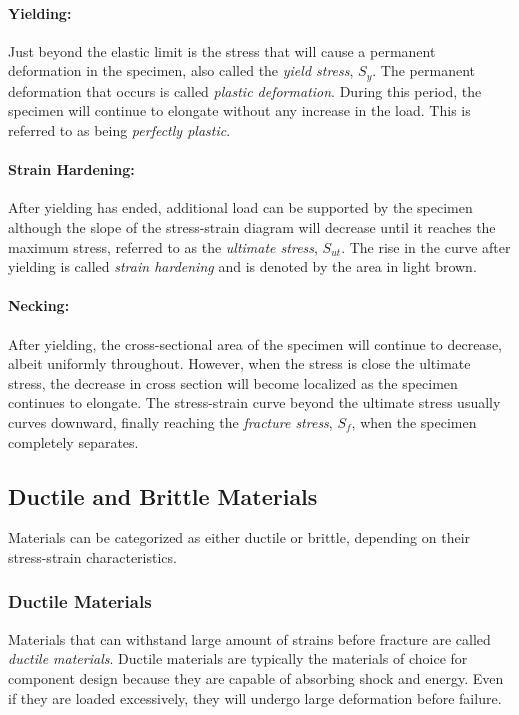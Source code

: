 \documentclass[
10pt,
a4paper,
openany,
svgnames,
]{book} %
\begin{document}
\paragraph{Yielding:} Just beyond the elastic limit is the stress that will cause a permanent deformation in the specimen, also called the \emph{yield stress}, $S_y$. The permanent deformation that occurs is called \emph{plastic deformation}. During this period, the specimen will continue to elongate without any increase in the load. This is referred to as being \emph{perfectly plastic}.

\paragraph{Strain Hardening:} After yielding has ended, additional load can be supported by the specimen although the slope of the stress-strain diagram will decrease until it reaches the maximum stress, referred to as the \emph{ultimate stress}, $S_{ut}$. The rise in the curve after yielding is called \emph{strain hardening} and is denoted by the area in light brown.

\paragraph{Necking:} After yielding, the cross-sectional area of the specimen will continue to decrease, albeit uniformly throughout. However, when the stress is close the ultimate stress, the decrease in cross section will become localized as the specimen continues to elongate. The stress-strain curve beyond the ultimate stress usually curves downward, finally reaching the \emph{fracture stress}, $S_f$, when the specimen completely separates.

\subsection{Ductile and Brittle Materials}

Materials can be categorized as either ductile or brittle, depending on their stress-strain characteristics.

\subsubsection{Ductile Materials}

Materials that can withstand large amount of strains before fracture are called \emph{ductile materials}. Ductile materials are typically the materials of choice for component design because they are capable of absorbing shock and energy. Even if they are loaded excessively, they will undergo large deformation before failure.
\end{document}
